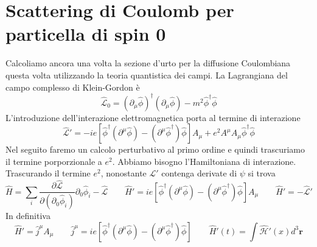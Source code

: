 \section{Scattering di Coulomb per particella di spin 0}
Calcoliamo ancora una volta la sezione d'urto per la diffusione Coulombiana questa volta utilizzando la teoria quantistica dei campi. La Lagrangiana del campo complesso di Klein-Gordon è
$$
\hat{\mathcal{L}}_0 = (\partial_\mu \hat{\phi})^\dagger (\partial_\mu \hat{\phi}) - m^2 \hat{\phi}^\dagger \hat{\phi}
$$
L'introduzione dell'interazione elettromagnetica porta al termine di interazione
$$
\hat{\mathcal{L}}' = -ie [\hat{\phi}^\dagger (\partial^\mu \hat{\phi}) - (\partial^\mu \hat{\phi}^\dagger) \hat{\phi}] A_\mu + e^2 A^\mu A_\mu \hat{\phi}^\dagger \hat{\phi}
$$
Nel seguito faremo un calcolo perturbativo al primo ordine e quindi trascuriamo il termine porporzionale a $e^2$. Abbiamo bisogno l'Hamiltoniana di interazione. Trascurando il termine $e^2$, nonostante $\mathcal{L'}$ contenga derivate di $\psi$ si trova
$$
\hat{H} = \sum_i \frac{\partial \hat{\mathcal{L}}}{\partial(\partial_0 \hat{\phi}_i)} \partial_0 \hat{\phi}_i - \hat{\mathcal{L}} \qquad \hat{H}' = ie [\hat{\phi}^\dagger (\partial^\mu \hat{\phi}) - (\partial^\mu \hat{\phi}^\dagger) \hat{\phi}] A_\mu \qquad \hat{H}' = -\hat{\mathcal{L}}'
$$
In definitiva
$$
\hat{H}' = \hat{j}^\mu A_\mu \qquad \hat{j}^\mu = ie [\hat{\phi}^\dagger (\partial^\mu \hat{\phi}) - (\partial^\mu \hat{\phi}^\dagger) \hat{\phi}] \qquad \hat{H}'(t) = \int \hat{\mathcal{H}}'(x) d^3\mathbf{r}
$$
